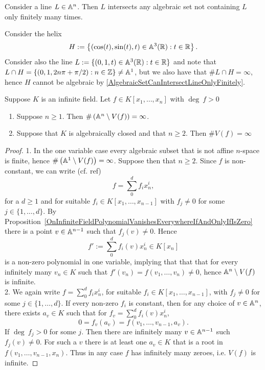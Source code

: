 \begin{corollary}\label{AlgebraicSetCanIntersectLineOnlyFinitely}
     Consider a line $L\in \mathbb{A}^n$. Then $L$ intersects any algebraic set not containing $L$ only finitely many times. 
\end{corollary}
\begin{example}
    Consider the helix 
        $$H := \left\{(\cos(t),\sin(t),t)\in \mathbb{A}^3(\mathbb{R}) : t\in \mathbb{R} \right\}.$$
    Consider also the line $L:=\{ (0,1,t)\in \mathbb{A}^3(\mathbb{R}) : t \in \mathbb{R}\}$ and note that $L \cap H = \{ (0,1, 2n\pi + \pi/2) : n\in \mathbb{Z}\}\neq \mathbb{A}^1$, but we also have that $\# L\cap H = \infty$, hence $H$ cannot be algebraic by \ref{AlgebraicSetCanIntersectLineOnlyFinitely}.
\end{example}
\begin{proposition}\label{AlgebraicSetsOverInfiniteFieldsAndAlgClosedFields}
    Suppose $K$ is an infinite field. Let $f\in K[x_1,\dots,x_n]$ with $\deg \ f>0$
    \begin{enumerate}
        \item Suppose $n\geq 1$. Then $\#\left(\mathbb{A}^n\setminus V(f)\right) = \infty$.
        \item Suppose that $K$ is algebraically closed and that $n\geq 2$. Then $\#V(f) = \infty$
    \end{enumerate}
\end{proposition}
\begin{proof}
    1. In the one variable case every algebraic subset that is not affine $n$-space is finite, hence $\#\left(\mathbb{A}^1\setminus V(f) \right) = \infty$. Suppose then that $n\geq 2$. Since $f$ is non-constant, we can write (cf. {\large ref})
    $$f = \sum_0^d f_ix_n^{i},$$
    for a $d\geq 1$ and for suitable $f_i\in K[x_1,\dots,x_{n-1}]$ with $f_j \neq0$ for some $j\in \{1,\dots,d\}$. By Proposition~\ref{OnInfiniteFieldPolynomialVanishesEverywhereIfAndOnlyIfIsZero} there is a point $v\in \mathbb{A}^{n-1}$ such that $f_j(v)\neq 0$. Hence 
    $$f' := \sum_0^d f_i(v)x_n^i\in K[x_n]$$
    is a non-zero polynomial in one variable, implying that that that for every infinitely many $v_n\in K$ such that $f'(v_n)=f(v_1,\dots,v_n)\neq 0$, hence $\mathbb{A}^n\setminus V(f)$ is infinite.\\
    2. We again write $f=\sum_0^d f_ix_n^i$, for suitable $f_i\in K[x_1,\dots,x_{n-1}]$, with $f_j\neq 0$ for some $j\in\{1,\dots,d\}$. If every non-zero $f_i$ is constant, then for any choice of $v\in \mathbb{A}^n$, there exists $a_v\in K$ such that for $f_v = \sum_0^d f_i(v)x_n^i$, 
    $$0 = f_v(a_v) = f(v_1,\dots,v_{n-1},a_v).$$
    If $\deg \ f_j >0$ for some $j$. Then there are infinitely many $v\in \mathbb{A}^{n-1}$ such $f_j(v)\neq 0$. For such a $v$ there is at least one $a_v\in K$ that is a root in $f(v_1,\dots,v_{n-1},x_n)$. Thus in any case $f$ has infinitely many zeroes, i.e. $V(f)$ is infinite.
\end{proof}
